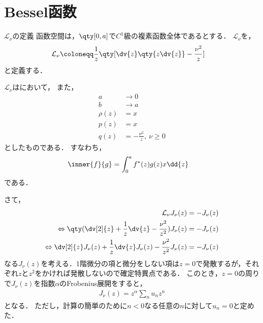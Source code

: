 \documentclass{report}
\begin{document}
    \section{Bessel函数}
      \begin{mydef}{$\mathcal{L}_{\nu}$の定義}{}
        函数空間は，$\qty[0, a]$で$C^1$級の複素函数全体であるとする．
        $\mathcal{L}_{\nu}$を，
        \begin{align}
          \mathcal{L}_{\nu} &\coloneqq \frac{1}{z}\qty[\dv{z}\qty{z\dv{z}} - \frac{\nu^2}{z}]
        \end{align}
        と定義する．
      \end{mydef}
      \begin{myrem}{}{}
        $\mathcal{L}_{\nu}$はにおいて，
        また，
        \begin{align}
          a &\to 0 \\ 
          b &\to a \\
          \rho(z) &= x \\ 
          p(z) &= x \\ 
          q(z) &= -\frac{\nu^2}{z},\ \nu \geq 0
        \end{align}
        としたものである．
        すなわち，
        \begin{align}
          \inner{f}{g} &= \int_{0}^{a}f^*(z)g(z)x\dd{z}
        \end{align}
        である．
      \end{myrem}
      さて，
      \begin{align}
        \mathcal{L}_{\nu}J_{\nu}(z) &= - J_{\nu}(z)  \\ 
        \Leftrightarrow \qty(\dv[2]{z} + \frac{1}{z}\dv{z} - \frac{\nu^2}{z^2})J_{\nu}(z) &= -J_{\nu}(z) \label{bessel-differential-eq-sub}\\ 
        \Leftrightarrow \dv[2]{z}J_{\nu}(z) + \frac{1}{z}\dv{z}J_{\nu}(z) - \frac{\nu^2}{z^2}J_{\nu}(z) &= -J_{\nu}(z) \label{bessel-differential-eq}
      \end{align}
      なる$J_{\nu}(z)$を考える．1階微分の項と微分をしない項は$z = 0$で発散するが，それぞれ$z$と$z^2$をかければ発散しないので確定特異点である．
      このとき，$z = 0$の周りで$J_{\nu}(z)$を指数$\alpha$のFrobenius展開をすると，
      \begin{align}
        J_{\nu}(z) = z^{\alpha}\sum_{n}u_nz^n\label{bessel-func-frobenius}
      \end{align}
      となる．
      ただし，計算の簡単のために$n < 0$なる任意の$n$に対して$u_n = 0$と定めた．
\end{document}
